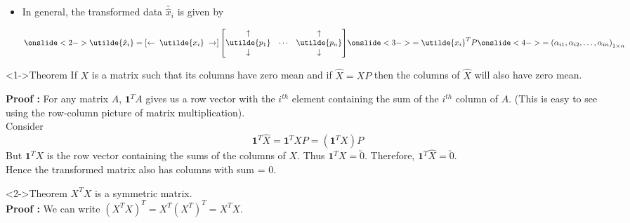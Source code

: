 \documentclass[10pt, aspectratio=169]{beamer}
\begin{document}
\begin{frame}
\begin{itemize}
\item<1-> In general, the transformed data $\utilde{\hat{x}_i}$ is given by

\[
\onslide<2->{\utilde{\hat{x}_i} = 
\left[ \leftarrow \; \utilde{x_i} \; \rightarrow \right]
\begin{bmatrix}
\uparrow & & \uparrow \\
\utilde{p_1} & \cdots & \utilde{p_n} \\
\downarrow & & \downarrow
\end{bmatrix}}
\onslide<3->{= \utilde{x_i}^T P} 
\onslide<4->{= \left( \alpha_{i1}, \alpha_{i2}, \ldots, \alpha_{in} \right)_{1 \times n}}
\]

\end{itemize}
\end{frame}


\begin{frame}
\begin{block}<1->{Theorem}
If $X$ is a matrix such that its columns have zero mean and if $\hat{X} = X P$ then the columns of $\hat{X}$ will also have zero mean.

\textbf{Proof :} For any matrix $A$, $\mathbf{1}^T A$ gives us a row vector with the $i^{th}$ element containing the sum of the $i^{th}$ column of $A$. (This is easy to see using the row-column picture of matrix multiplication). \\
Consider
\[
\mathbf{1}^T \hat{X} = \mathbf{1}^T X P = \left(\mathbf{1}^T X\right) P
\]
But $\mathbf{1}^T X$ is the row vector containing the sums of the columns of $X$. Thus $\mathbf{1}^T X = \utilde{0}$. Therefore, $\mathbf{1}^T \hat{X} = \utilde{0}$. \\
Hence the transformed matrix also has columns with sum = 0.
\end{block}

\begin{block}<2->{Theorem}
$X^T X$ is a symmetric matrix. \\
\textbf{Proof :} We can write
$ \left( X^T X \right)^T = X^T \left( X^T \right)^T = X^T X $.
\end{block}
\end{frame}
\end{document}
